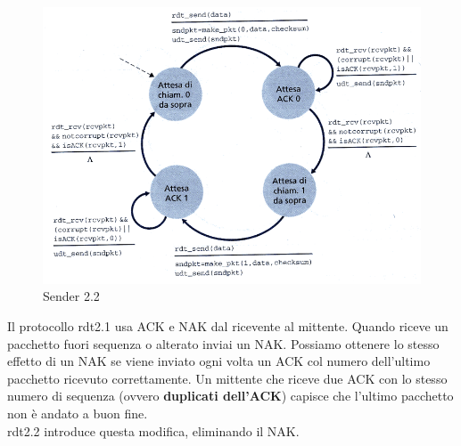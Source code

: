 \documentclass[11pt,a4paper]{article}
\begin{document}
\begin{figure}
		\includegraphics[scale=0.6]{img/020.png}
		\caption{Sender 2.2}
\end{figure}
Il protocollo rdt2.1 usa ACK e NAK dal ricevente al mittente. Quando riceve un pacchetto fuori sequenza o alterato inviai un NAK. Possiamo ottenere lo stesso effetto di un NAK se viene inviato ogni volta un ACK col numero dell'ultimo pacchetto ricevuto correttamente. Un mittente che riceve due ACK con lo stesso numero di sequenza (ovvero \textbf{duplicati dell'ACK}) capisce che l'ultimo pacchetto non è andato a buon fine. \\
rdt2.2 introduce questa modifica, eliminando il NAK.
\end{document}
